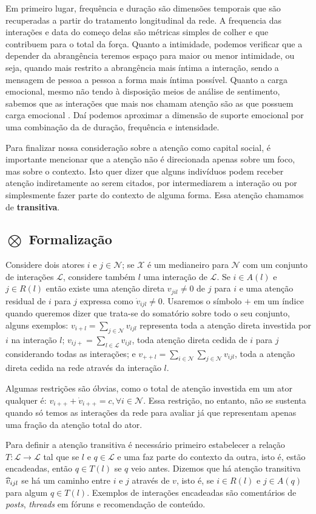 Em primeiro lugar, frequência e duração são dimensões temporais que são
recuperadas a partir do tratamento longitudinal da rede. A frequencia das
interações e data do começo delas são métricas simples de colher e que contribuem
para o total da força. Quanto a intimidade, podemos verificar que a
depender da abrangência teremos espaço para maior ou menor intimidade, ou seja, quando mais
restrito a abrangência mais íntima a interação, sendo a mensagem de pessoa a
pessoa a forma mais íntima possível. Quanto a carga emocional, mesmo não tendo à
disposição meios de análise de sentimento, sabemos que as interações que mais nos
chamam atenção são as que possuem carga emocional \citep{Davenport2001}. Daí
podemos aproximar a dimensão de suporte emocional por uma combinação da de
duração, frequência e intensidade.

Para finalizar nossa consideração sobre a atenção como capital social, é
importante mencionar que a atenção não é direcionada apenas sobre um foco, mas
sobre o contexto. Isto quer dizer que alguns indivíduos podem receber atenção
indiretamente ao serem citados, por intermediarem a interação ou por
simplesmente fazer parte do contexto de alguma forma. Essa atenção chamamos de
\textbf{transitiva}.

\subsection{$\bigotimes$ Formalização}

Considere dois atores $i$ e $j \in \mathscr{N}$; se $\mathscr{X}$ é um medianeiro
para $\mathscr{N}$ com um conjunto de interações $\mathscr{L}$, considere também
$l$ uma interação de $\mathscr{L}$. Se $i \in A(l)$ e $j \in R(l)$ então existe
uma atenção direta $v_{jil}\neq0$ de $j$ para $i$ e uma atenção residual de $i$
para $j$ expressa como $\dot{v}_{ijl}\neq0$. Usaremos o símbolo $+$ em um índice
quando queremos dizer que trata-se do somatório sobre todo o seu conjunto, alguns
exemplos: $v_{i+l} = \sum_{j \in \mathscr{N}}v_{ijl}$ representa toda a atenção
direta investida por $i$ na interação $l$; $v_{ij+} = \sum_{l \in
\mathscr{L}}v_{ijl}$, toda atenção direta cedida de $i$ para $j$ considerando
todas as interações; e $v_{++l} = \sum_{i \in \mathscr{N}}\sum_{j \in
\mathscr{N}}v_{ijl}$, toda a atenção direta cedida na rede através da interação
$l$.

Algumas restrições são óbvias, como o total de atenção investida em um ator
qualquer é: $v_{i++} + \dot{v}_{i++} = c, \forall i \in \mathscr{N}$. Essa
restrição, no entanto, não se sustenta quando só temos as interações da rede
para avaliar já que representam apenas uma fração da atenção total do ator.

Para definir a atenção transitiva é necessário primeiro estabelecer a relação
$T:\mathscr{L}\to\mathscr{L}$ tal que se $l$ e $q \in \mathscr{L}$ e uma faz
parte do contexto da outra, isto é, estão encadeadas, então $q \in T(l)$ se $q$
veio antes. Dizemos que há atenção transitiva $\widetriangle{v}_{ijl}$ se há um
caminho entre $i$ e $j$ através de $v$, isto é, se $i \in R(l)$ e $j \in A(q)$
para algum $q \in T(l)$. Exemplos de interações encadeadas são comentários de
\emph{posts}, \emph{threads} em fóruns e recomendação de conteúdo.
